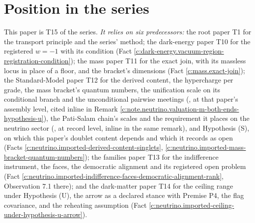 \documentclass[11pt]{article}
\theoremstyle{definition}
\theoremstyle{plain}
\begin{document}
\section{Position in the series}

\label{c:note.neutrino.setting-position-series}
This paper is T15 of the series. \emph{It relies on six predecessors:} the root paper T1 \cite{ButlerT1} for the transport principle and the series' method; the dark-energy paper T10 \cite{ButlerT10} for the registered $w = -1$ with its condition (Fact \ref{c:dark-energy.vacuum-region-registration-condition}); the mass paper T11 \cite{ButlerT11} for the exact join, with its massless locus in place of a floor, and the bracket's dimensions (Fact \ref{c:mass.exact-join}); the Standard-Model paper T12 \cite{ButlerT12} for the derived content, the hypercharge per grade, the mass bracket's quantum numbers, the unification scale on its conditional branch and the unconditional pairwise meetings (\cite[Prop.~6.2]{ButlerT12}, at that paper's assembly level, cited inline in Remark \ref{c:note.neutrino.valuation-m-both-ends-hypothesis-u}), the Pati-Salam chain's scales and the requirement it places on the neutrino sector (\cite[Props.~10.10, 11.2]{ButlerT12}, at record level, inline in the same remark), and Hypothesis (S), on which this paper's doublet content depends and which it records as open (Facts \ref{c:neutrino.imported-derived-content-singlets}, \ref{c:neutrino.imported-mass-bracket-quantum-numbers}); the families paper T13 \cite{ButlerT13} for the indifference instrument, the faces, the democratic alignment and its registered open problem (Fact \ref{c:neutrino.imported-indifference-faces-democratic-alignment-rank}, Observation 7.1 there); and the dark-matter paper T14 \cite{ButlerT14} for the ceiling range under Hypothesis (U), the arrow as a declared stance with Premise P4, the flag covariance, and the reheating assumption (Fact \ref{c:neutrino.imported-ceiling-under-hypothesis-u-arrow}).
\end{document}
